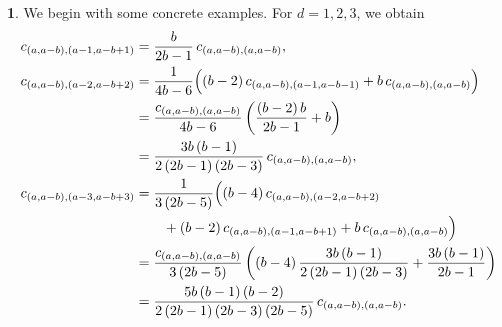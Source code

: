 \documentclass[10pt,oneside,american]{amsart}
\numberwithin{equation}{section}
\numberwithin{figure}{section}
\theoremstyle{plain}
\theoremstyle{definition}
\theoremstyle{remark}
\theoremstyle{plain}
\theoremstyle{definition}
\newtheorem{example}[thm]{\protect\examplename}
\theoremstyle{plain}
\theoremstyle{plain}
\providecommand{\examplename}{Example}
\begin{document}
\begin{example}\label{ex:twoparts}
We begin with some concrete examples.  For $d=1,2,3$, we obtain
\begin{align*}
  c_{\left(a,a-b\right),\left(a-1,a-b+1\right)} &= \frac{b}{2b-1}\,c_{\left(a,a-b\right),\left(a,a-b\right)}, \\
  c_{\left(a,a-b\right),\left(a-2,a-b+2\right)} &=
    \frac{1}{4b-6}\Bigl((b-2)\,c_{(a,a-b),(a-1,a-b-1)}+b\,c_{(a,a-b),(a,a-b)}\Bigr) \\
  &= \frac{c_{\left(a,a-b\right),\left(a,a-b\right)}}{4b-6}\left(\frac{\left(b-2\right)b}{2b-1}+b\right) \\
  &= \frac{3b\left(b-1\right)}{2\left(2b-1\right)\left(2b-3\right)}\,c_{(a,a-b),(a,a-b)}, \\
  c_{\left(a,a-b\right),\left(a-3,a-b+3\right)} &=
    \frac{1}{3\left(2b-5\right)}\Bigl(\left(b-4\right)c_{(a,a-b),(a-2,a-b+2)} \\
    &\qquad +\left(b-2\right)c_{(a,a-b),(a-1,a-b+1)}+b\, c_{(a,a-b),(a,a-b)}\Bigr)\\
  &= \frac{c_{\left(a,a-b\right),\left(a,a-b\right)}}{3\left(2b-5\right)}
    \left(\left(b-4\right)\frac{3b\left(b-1\right)}{2\left(2b-1\right)\left(2b-3\right)}+\frac{3b\left(b-1\right)}{2b-1}\right)\\
  &= \frac{5b\left(b-1\right)\left(b-2\right)}{2\left(2b-1\right)\left(2b-3\right)\left(2b-5\right)}\,c_{(a,a-b),(a,a-b)}.
\end{align*}
\end{example}
\end{document}
